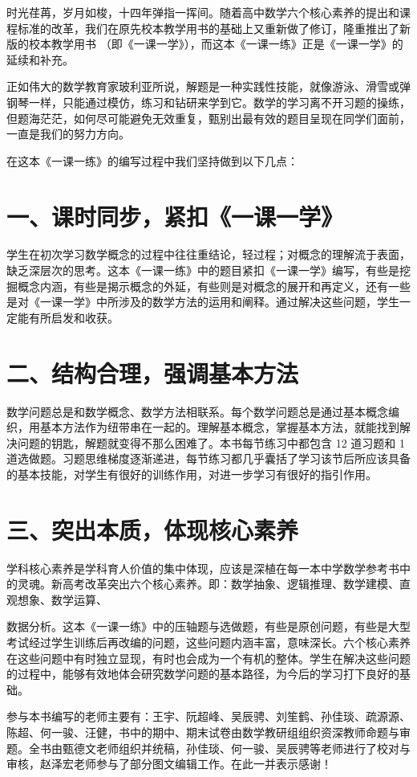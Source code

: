 \documentclass[10pt]{article}
\begin{document}
时光荏苒，岁月如梭，十四年弹指一挥间。随着高中数学六个核心素养的提出和课程标准的改革，我们在原先校本教学用书的基础上又重新做了修订，隆重推出了新版的校本教学用书 （即《一课一学》），而这本《一课一练》正是《一课一学》的延续和补充。

正如伟大的数学教育家玻利亚所说，解题是一种实践性技能，就像游泳、滑雪或弹钢琴一样，只能通过模仿，练习和钻研来学到它。数学的学习离不开习题的操练，但题海茫茫，如何尽可能避免无效重复，甄别出最有效的题目呈现在同学们面前，一直是我们的努力方向。

在这本《一课一练》的编写过程中我们坚持做到以下几点：

\section*{一、课时同步，紧扣《一课一学》}
学生在初次学习数学概念的过程中往往重结论，轻过程；对概念的理解流于表面，缺乏深层次的思考。这本《一课一练》中的题目紧扣《一课一学》编写，有些是挖掘概念内涵，有些是揭示概念的外延，有些则是对概念的展开和再定义，还有一些是对《一课一学》中所涉及的数学方法的运用和阐释。通过解决这些问题，学生一定能有所启发和收获。

\section*{二、结构合理，强调基本方法}
数学问题总是和数学概念、数学方法相联系。每个数学问题总是通过基本概念编织，用基本方法作为纽带串在一起的。理解基本概念，掌握基本方法，就能找到解决问题的钥匙，解题就变得不那么困难了。本书每节练习中都包含 12 道习题和 1 道选做题。习题思维梯度逐渐递进，每节练习都几乎囊括了学习该节后所应该具备的基本技能，对学生有很好的训练作用，对进一步学习有很好的指引作用。

\section*{三、突出本质，体现核心素养}
学科核心素养是学科育人价值的集中体现，应该是深植在每一本中学数学参考书中的灵魂。新高考改革突出六个核心素养。即：数学抽象、逻辑推理、数学建模、直观想象、数学运算、

数据分析。这本《一课一练》中的压轴题与选做题，有些是原创问题，有些是大型考试经过学生训练后再改编的问题，这些问题内涵丰富，意味深长。六个核心素养在这些问题中有时独立显现，有时也会成为一个有机的整体。学生在解决这些问题的过程中，能够有效地体会研究数学问题的基本路径，为今后的学习打下良好的基础。

参与本书编写的老师主要有：王宇、阮超峰、吴辰骋、刘笙鹤、孙佳琰、疏源源、陈超、何一骏、汪健，书中的期中、期末试卷由数学教研组组织资深教师命题与审题。全书由甄德文老师组织并统稿，孙佳琰、何一骏、吴辰骋等老师进行了校对与审核，赵泽宏老师参与了部分图文编辑工作。在此一并表示感谢！
\end{document}
